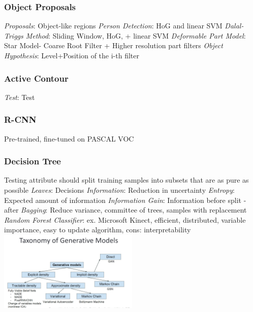 \documentclass{article}
\begin{document}
\begin{multicols*}{2}
        \subsubsection*{Object Proposals}
        \textit{Proposals}: Object-like regions\newline
        \textit{Person Detection}: HoG and linear SVM\newline
        \textit{Dalal-Triggs Method}: Sliding Window, HoG, + linear SVM\newline
        \textit{Deformable Part Model}: Star Model- Coarse Root Filter + Higher resolution part
        filters\newline
        \textit{Object Hypothesis}: Level+Position of the i-th filter\newline
        \subsubsection*{Active Contour}
        \textit{Test}: Test\newline
        \subsubsection*{R-CNN}
        Pre-trained, fine-tuned on PASCAL VOC\newline
        \subsubsection*{Decision Tree}
        Testing attribute should split training samples into subsets that are as pure as possible\newline
        \textit{Leaves}: Decisions\newline
        \textit{Information}: Reduction in uncertainty\newline
        \textit{Entropy}: Expected amount of information\newline
        \textit{Information Gain}: Information before split - after\newline
        \textit{Bagging}: Reduce variance, committee of trees, samples with replacement\newline
        \textit{Random Forest Classifier}: ex. Microsoft Kinect, efficient, distributed,
        variable importance, easy to update algorithm, cons: interpretability\newline
        \includegraphics[width=0.5\textwidth]{generative_models}\newline

\end{multicols*}
\end{document}

